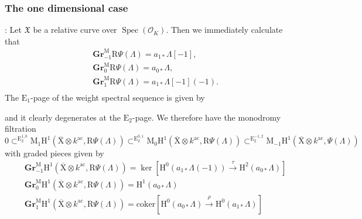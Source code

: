 \documentclass[10pt]{amsart}
\numberwithin{equation}{section}
\theoremstyle{plain}
\numberwithin{equation}{section}
\theoremstyle{definition}
\theoremstyle{remark}
\def\coker{\mathrm{coker}}
\def\ac{\mathrm{ac}}
\def\ac{\mathrm{ac}}
\DeclareMathOperator{\Spec}{Spec}
\def\calO{\mathcal{O}}
\def\rmH{\mathrm{H}}
\def\rmE{\mathrm{E}}
\def\rmM{\mathrm{M}}
\def\rmX{\mathrm{X}}
\def\rmXbar{\overline{\rmX}}
\def\rmR{\mathrm{R}}
\newcommand{\Gr}{\mathbf{Gr}}
\begin{document}
\subsubsection{The one dimensional case}\label{1-dim}\label{one-mono}: Let $\mathfrak{X}$ be a relative curve over $\Spec(\calO_{K})$. Then we immediately calculate that
\begin{equation}
\begin{aligned}
&\Gr^{\rmM}_{-1}\rmR\Psi(\Lambda)=a_{1*}\Lambda[-1], \\
&\Gr^{\rmM}_{0}\rmR\Psi(\Lambda)=a_{0*}\Lambda,  \\
&\Gr^{\rmM}_{1}\rmR\Psi(\Lambda)=a_{1*}\Lambda[-1](-1). \\
\end{aligned}
\end{equation}
The $\rmE_{1}$-page of the weight spectral sequence is given by
\begin{center}
\end{center}
and it clearly degenerates at the $\rmE_{2}$-page.  We therefore have the monodromy filtration 
\begin{equation*}
0\subset^{\rmE^{1,0}_{2}} \rmM_{1}\rmH^{1}(\rmXbar\otimes{k^{\ac}}, \rmR\Psi(\Lambda))\subset^{\rmE^{0,1}_{2}} \rmM_{0}\rmH^{1}(\rmXbar\otimes{k^{\ac}}, \rmR\Psi(\Lambda))\subset^{\rmE^{-1,2}_{2}} \rmM_{-1}\rmH^{1}(\rmXbar\otimes{k^{\ac}},\Psi(\Lambda))
\end{equation*}
with graded pieces given by
\begin{equation}\label{curve-grade}
\begin{aligned}
&\Gr^{\rmM}_{-1}\rmH^{1}(\rmXbar\otimes{k^{\ac}}, \rmR\Psi(\Lambda))=\ker[\rmH^{0}(a_{1*}\Lambda(-1))\xrightarrow{\tau} \rmH^{2}(a_{0*}\Lambda)]\\
&\Gr^{\rmM}_{0}\rmH^{1}(\rmXbar\otimes{k^{\ac}}, \rmR\Psi(\Lambda))= \rmH^{1}(a_{0*}\Lambda)\\
&\Gr^{\rmM}_{1}\rmH^{1}(\rmXbar\otimes{k^{\ac}}, \rmR\Psi(\Lambda))= \coker[\rmH^{0}(a_{0*}\Lambda)\xrightarrow{\rho} \rmH^{0}(a_{1*}\Lambda)]\\
\end{aligned}
\end{equation}
\end{document}
